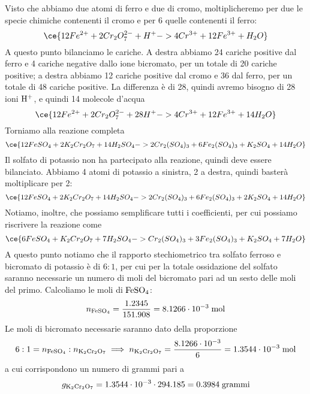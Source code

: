 \begin{soluzione}
    Visto che abbiamo due atomi di ferro e due di cromo, moltiplicheremo per due le specie chimiche contenenti il cromo e per 6 quelle contenenti il ferro:
    \begin{equation*}
        \ce{12Fe^{2+} + 2Cr_2O_7^{2-} + H^+ -> 4Cr^{3+} + 12Fe^{3+} + H_2O}
    \end{equation*}
    A questo punto bilanciamo le cariche. A destra abbiamo 24 cariche positive dal ferro e 4 cariche negative dallo ione bicromato, per un totale di 20 cariche positive; a destra abbiamo 12 cariche positive dal cromo e 36 dal ferro, per un totale di 48 cariche positive. La differenza è di 28, quindi avremo bisogno di 28 ioni $\rm H^+$, e quindi 14 molecole d'acqua
    \begin{equation*}
        \ce{12Fe^{2+} + 2Cr_2O_7^{2-} + 28H^+ -> 4Cr^{3+} + 12Fe^{3+} + 14H_2O}
    \end{equation*}
    Torniamo alla reazione completa
    \begin{equation*}
        \ce{12FeSO_4 + 2K_2Cr_2O_7 + 14H_2SO_4 -> 2Cr_2(SO_4)_3 + 6Fe_2(SO_4)_3 + K_2SO_4 + 14H_2O}
    \end{equation*}
    Il solfato di potassio non ha partecipato alla reazione, quindi deve essere bilanciato. Abbiamo 4 atomi di potassio a sinistra, 2 a destra, quindi basterà moltiplicare per 2:
    \begin{equation*}
        \ce{12FeSO_4 + 2K_2Cr_2O_7 + 14H_2SO_4 -> 2Cr_2(SO_4)_3 + 6Fe_2(SO_4)_3 + 2K_2SO_4 + 14H_2O}
    \end{equation*}
    Notiamo, inoltre, che possiamo semplificare tutti i coefficienti, per cui possiamo riscrivere la reazione come
    \begin{equation*}
        \ce{6FeSO_4 + K_2Cr_2O_7 + 7H_2SO_4 -> Cr_2(SO_4)_3 + 3Fe_2(SO_4)_3 + K_2SO_4 + 7H_2O}
  \end{equation*}
    A questo punto notiamo che il rapporto stechiometrico tra solfato ferroso e bicromato di potassio è di $6:1$, per cui per la totale ossidazione del solfato saranno necessarie un numero di moli del bicromato pari ad un sesto delle moli del primo. Calcoliamo le moli di $\rm FeSO_4$:
    \begin{equation*}
        n_{\rm FeSO_4}=\frac{1.2345}{151.908}=8.1266 \cdot 10^{-3} \; \rm mol
    \end{equation*}
    Le moli di bicromato necessarie saranno dato della proporzione
    \begin{equation*}
        6:1=n_{\rm FeSO_4}:n_{\rm K_2Cr_2O_7}
        \implies
        n_{\rm K_2Cr_2O_7}
        =\frac{8.1266 \cdot 10^{-3}}{6}
        =1.3544 \cdot 10^{-3} \; \rm mol
    \end{equation*}
    a cui corrispondono un numero di grammi pari a
    \begin{equation*}
        g_{\rm K_2Cr_2O_7}
        =1.3544 \cdot 10^{-3} \cdot 294.185
        =0.3984 \; \rm grammi
    \end{equation*}
\end{soluzione}

